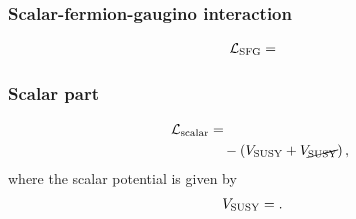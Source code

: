 \documentclass[CheatSheet]{subfiles}
\begin{document}
\subsubsection{Scalar-fermion-gaugino interaction}
\begin{equation}
\begin{split}
  \mathcal L\w{SFG} &=
 
\end{split}
\end{equation}

\subsubsection{Scalar part}
\begin{equation}
\begin{split}
  \mathcal L\w{scalar} &=
 
\\&\quad -\left(V\w{SUSY} + V_{\cancel{\mathrm{SUSY}}}\right),\label{eq:Lscalar}
\end{split}
\end{equation}
where the scalar potential is given by
\begin{equation}
  \begin{split}
   V_{\mathrm{SUSY}} &= .
  \end{split}\label{eq:SUSYpotential}
\end{equation}
\end{document}
